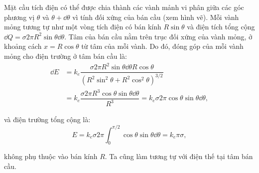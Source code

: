 \begin{loigiai}
\begin{center}
\begin{tikzpicture}[x=0.75pt,y=0.75pt,yscale=-1,xscale=1]
\end{tikzpicture}
\end{center}
Mặt cầu tích điện có thể được chia thành các vành mảnh vi phân giữa các góc phương vị $\theta$ và $\theta + \dd \theta$ vì tính đối xứng của bán cầu (xem hình vẽ). Mỗi vành mỏng tương tự như một vòng tích điện có bán kính $R\sin \theta$ và điện tích tổng cộng $\dd Q = \sigma 2 \pi R^2 \sin \theta \dd \theta $. Tâm của bán cầu nằm trên trục đối xứng của vành mỏng, ở khoảng cách $x= R \cos \theta$ từ tâm của mỗi vành. Do đó, đóng góp của mỗi vành mỏng cho điện trường ở tâm bán cầu là: 
    \[\begin{aligned} \dd E & = k_e \dfrac{\sigma 2 \pi R^2 \sin \theta \dd \theta R \cos \theta}{(R^2 \sin^2 \theta + R^2 \cos^2\theta)^{3/2}} \\
        & =  k_e \dfrac{\sigma 2 \pi R^3 \cos \theta \sin \theta \dd \theta}{R^3} = k_e \sigma 2 \pi \cos \theta \sin \theta \dd \theta, \end{aligned} \tag{5} \]

và điện trường tổng cộng là:
       \[ E = k_e  \sigma  2 \pi \int_{0}^{\pi/2} \cos \theta \sin \theta \dd \theta = k_e \pi \sigma, \tag{6} \]

không phụ thuộc vào bán kính $R$. Ta cũng làm tương tự với điện thế tại tâm bán cầu.
\end{loigiai}

